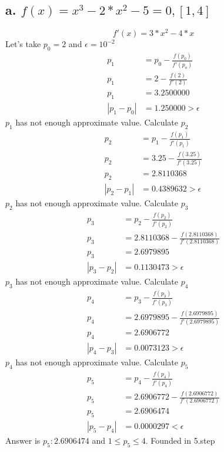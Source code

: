 \documentclass{article}
\begin{document}
\subsection{a. $f(x)=x^3-2*x^2-5 = 0, [1, 4]$}
\begin{equation}
f'(x)=3*x^2-4*x
\end{equation}
Let's take $p_0=2$ and $\epsilon=10^{-2}$
\begin{align}
\label{2.3.5.a.1}p_1 & = p_0 - \frac{f(p_0)}{f'(p_o)}\\
\label{2.3.5.a.2}p_1 & = 2 - \frac{f(2)}{f'(2)}\\
\label{2.3.5.a.3}p_1 & = 3.2500000\\
\label{2.3.5.a.4}|p_1-p_0| & =1.250000 > \epsilon
\end{align}
$p_1$ has not enough approximate value. Calculate $p_2$
\begin{align}
\label{2.3.5.a.1}p_2 & = p_1 - \frac{f(p_1)}{f'(p_1)}\\
\label{2.3.5.a.2}p_2 & = 3.25 - \frac{f(3.25)}{f'(3.25)}\\
\label{2.3.5.a.3}p_2 & = 2.8110368\\
\label{2.3.5.a.4}|p_2-p_1| & =0.4389632 > \epsilon
\end{align}
$p_2$ has not enough approximate value. Calculate $p_3$
\begin{align}
\label{2.3.5.a.1}p_3 & = p_2 - \frac{f(p_2)}{f'(p_2)}\\
\label{2.3.5.a.2}p_3 & = 2.8110368 - \frac{f(2.8110368)}{f'(2.8110368)}\\
\label{2.3.5.a.3}p_3 & = 2.6979895\\
\label{2.3.5.a.4}|p_3-p_2| & =0.1130473 > \epsilon
\end{align}
$p_3$ has not enough approximate value. Calculate $p_4$
\begin{align}
\label{2.3.5.a.1}p_4 & = p_3 - \frac{f(p_3)}{f'(p_3)}\\
\label{2.3.5.a.2}p_4 & = 2.6979895 - \frac{f(2.6979895)}{f'(2.6979895)}\\
\label{2.3.5.a.3}p_4 & = 2.6906772\\
\label{2.3.5.a.4}|p_4-p_3| & =0.0073123 > \epsilon
\end{align}
$p_4$ has not enough approximate value. Calculate $p_5$
\begin{align}
\label{2.3.5.a.1}p_5 & = p_4 - \frac{f(p_4)}{f'(p_4)}\\
\label{2.3.5.a.2}p_5 & = 2.6906772 - \frac{f(2.6906772)}{f'(2.6906772)}\\
\label{2.3.5.a.3}p_5 & = 2.6906474\\
\label{2.3.5.a.4}|p_5-p_4| & =0.0000297 < \epsilon
\end{align}
Answer is $p_5:2.6906474$ and $1\leq p_5 \leq 4$. Founded in 5.step
\end{document}
